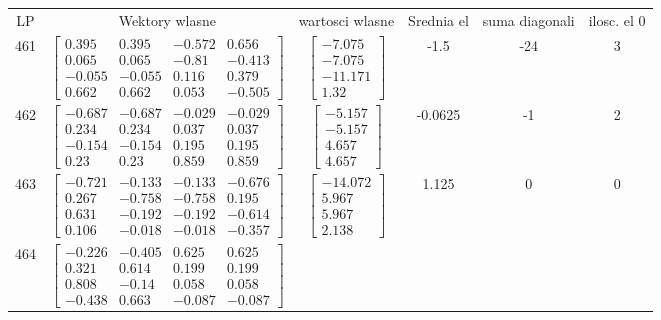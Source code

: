 \documentclass[a4paper,12pt]{article}
\begin{document}
\bgroup {} \vspace{0.2in} \begin{tabular}{c c c c c c}
LP &Wektory wlasne & wartosci wlasne & Srednia el & suma diagonali & ilosc. el 0\\
461
&
$\begin{bmatrix} 0.395 & 0.395 & -0.572 & 0.656 \\ 0.065 & 0.065 & -0.81 & -0.413 \\ -0.055 & -0.055 & 0.116 & 0.379 \\ 0.662 & 0.662 & 0.053 & -0.505 \end{bmatrix}$
&
$\begin{bmatrix} -7.075 \\ -7.075 \\ -11.171 \\ 1.32 \end{bmatrix}$
&
-1.5
&
-24
&
3
\\
462
&
$\begin{bmatrix} -0.687 & -0.687 & -0.029 & -0.029 \\ 0.234 & 0.234 & 0.037 & 0.037 \\ -0.154 & -0.154 & 0.195 & 0.195 \\ 0.23 & 0.23 & 0.859 & 0.859 \end{bmatrix}$
&
$\begin{bmatrix} -5.157 \\ -5.157 \\ 4.657 \\ 4.657 \end{bmatrix}$
&
-0.0625
&
-1
&
2
\\
463
&
$\begin{bmatrix} -0.721 & -0.133 & -0.133 & -0.676 \\ 0.267 & -0.758 & -0.758 & 0.195 \\ 0.631 & -0.192 & -0.192 & -0.614 \\ 0.106 & -0.018 & -0.018 & -0.357 \end{bmatrix}$
&
$\begin{bmatrix} -14.072 \\ 5.967 \\ 5.967 \\ 2.138 \end{bmatrix}$
&
1.125
&
0
&
0
\\
464
&
$\begin{bmatrix} -0.226 & -0.405 & 0.625 & 0.625 \\ 0.321 & 0.614 & 0.199 & 0.199 \\ 0.808 & -0.14 & 0.058 & 0.058 \\ -0.438 & 0.663 & -0.087 & -0.087 \end{bmatrix}$

\end{tabular}
\end{document}
